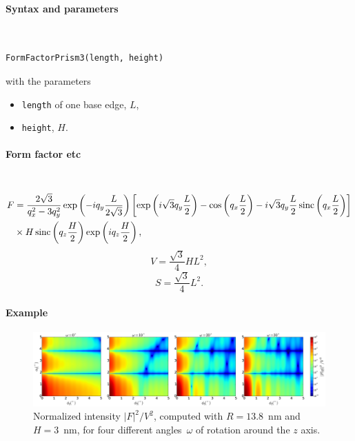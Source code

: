 \FloatBarrier

\paragraph{Syntax and parameters}\strut\\[-2ex plus .2ex minus .2ex]
\begin{lstlisting}[language=python, style=eclipseboxed,numbers=none,nolol]
  FormFactorPrism3(length, height)
\end{lstlisting}
with the parameters
\begin{itemize}
\item \texttt{length} of one base edge, $L$,
\item \texttt{height}, $H$.
\end{itemize}


\paragraph{Form factor etc}\strut\\
\begin{align*}
F &= \frac{2 \sqrt{3}}{q_x^2-3q_y^2} 
     \exp\left(-i q_y\frac{L}{2\sqrt{3}}\right)
    \left[\exp\left(i \sqrt{3} q_y \frac{L}{2} \right)-\cos\left(q_x \frac{L}{2}\right)
    -i \sqrt{3} q_y \frac{L}{2} \operatorname{sinc}\left(q_x \frac{L}{2}\right) \right] \\
  &
  \times  H \operatorname{sinc}\left(q_z \frac{H}{2} \right) \exp\left(i q_z \frac{H}{2}\right),
\end{align*}
\begin{equation*}
  V= \dfrac{\sqrt{3}}{4} H L^2,
\end{equation*}
\begin{equation*}
  S =\dfrac{\sqrt{3}}{4}L^2.
\end{equation*}

\paragraph{Example}\strut

\begin{figure}[H]
\begin{center}
\includegraphics[width=\textwidth]{fig/ff2/ff_prism3.pdf}
\end{center}
\caption{Normalized intensity $|F|^2/V^2$,
computed with $R=13.8$~nm and $H=3$~nm,
for four different angles~$\omega$ of rotation around the $z$ axis.}
\label{fig:FFprism3Ex}
\end{figure}

